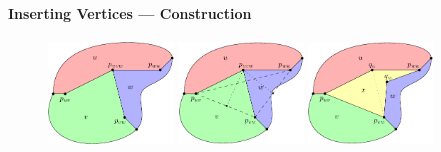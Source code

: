\documentclass[t,18pt]{beamer}
\newcommand{\emdash}{---}
\begin{document}
\begin{frame}[c]
  \frametitle{}
  \framesubtitle{Inserting Vertices \emdash{} Construction}
  \begin{figure}
    \includegraphics[height=2.7cm]{../Thesis/Resources/InsertVertex-Illustration-1.pdf}\quad
    \includegraphics[height=2.7cm]{../Thesis/Resources/InsertVertex-Illustration-2.pdf}\quad
    \includegraphics[height=2.7cm]{../Thesis/Resources/InsertVertex-Illustration-3.pdf}
  \end{figure}
\end{frame}
\end{document}
